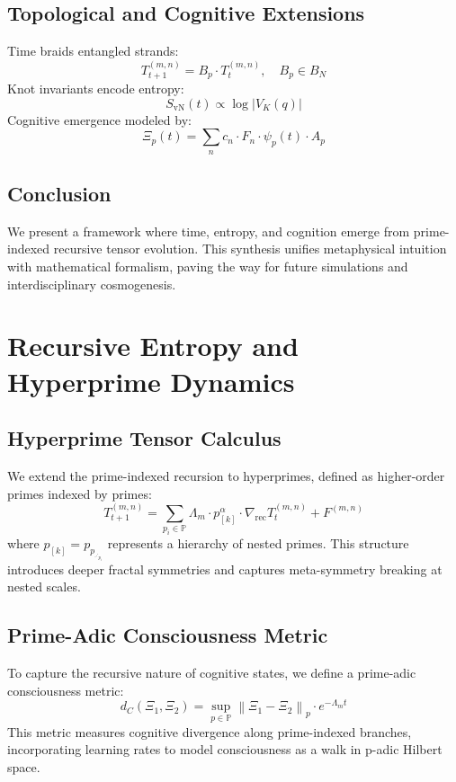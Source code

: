\documentclass[12pt]{article}
\begin{document}
\subsection{Topological and Cognitive Extensions}
Time braids entangled strands:
\begin{equation}
T_{t+1}^{(m,n)} = B_p \cdot T_t^{(m,n)}, \quad B_p \in B_N
\end{equation}
Knot invariants encode entropy:
\begin{equation}
S_{\text{vN}}(t) \propto \log |V_K(q)|
\end{equation}
Cognitive emergence modeled by:
\begin{equation}
\Xi_p(t) = \sum_{n} c_n \cdot F_n \cdot \psi_p(t) \cdot A_p
\end{equation}

\subsection{Conclusion}
We present a framework where time, entropy, and cognition emerge from prime-indexed recursive tensor evolution. This synthesis unifies metaphysical intuition with mathematical formalism, paving the way for future simulations and interdisciplinary cosmogenesis.

\section{Recursive Entropy and Hyperprime Dynamics}


\subsection{Hyperprime Tensor Calculus}
We extend the prime-indexed recursion to hyperprimes, defined as higher-order primes indexed by primes:
\begin{equation}
T_{t+1}^{(m,n)} = \sum_{p_i \in \mathbb{P}} \Lambda_m \cdot p_{[k]}^\alpha \cdot \nabla_{\text{rec}} T_t^{(m,n)} + F^{(m,n)}
\end{equation}
where \(p_{[k]} = p_{p_{\iddots_{p_i}}}\) represents a hierarchy of nested primes. This structure introduces deeper fractal symmetries and captures meta-symmetry breaking at nested scales.

\subsection{Prime-Adic Consciousness Metric}
To capture the recursive nature of cognitive states, we define a prime-adic consciousness metric:
\begin{equation}
d_C(\Xi_1, \Xi_2) = \sup_{p \in \mathbb{P}} \left\| \Xi_1 - \Xi_2 \right\|_p \cdot e^{-\Lambda_m t}
\end{equation}
This metric measures cognitive divergence along prime-indexed branches, incorporating learning rates to model consciousness as a walk in p-adic Hilbert space.
\end{document}
